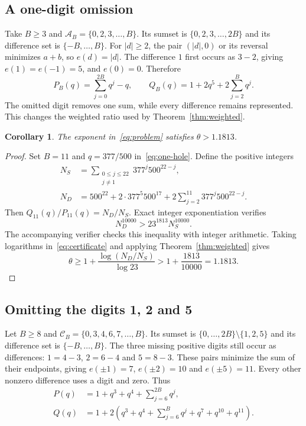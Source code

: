 \documentclass[11pt,a4paper]{article}
\newtheorem{corollary}[theorem]{Corollary}
\newcommand{\A}{\mathcal A}
\begin{document}
\subsection{A one-digit omission}

Take $B\ge3$ and $\A_B=\{0,2,3,\ldots,B\}$. Its sumset is
$\{0,2,3,\ldots,2B\}$ and its difference set is $\{-B,\ldots,B\}$.
For $|d|\ge2$, the pair $(|d|,0)$ or its reversal minimizes $a+b$, so
$e(d)=|d|$. The difference $1$ first occurs as $3-2$, giving
$e(1)=e(-1)=5$, and $e(0)=0$. Therefore
\begin{equation}\label{eq:one-hole}
 P_B(q)=\sum_{j=0}^{2B}q^j-q,
 \qquad
 Q_B(q)=1+2q^5+2\sum_{j=2}^{B}q^j.
\end{equation}
The omitted digit removes one sum, while every difference remains
represented. This changes the weighted ratio used by
Theorem~\ref{thm:weighted}.

\begin{corollary}\label{cor:explicit}
The exponent in~\eqref{eq:problem} satisfies $\theta>1.1813$.
\end{corollary}
\begin{proof}
Set $B=11$ and $q=377/500$ in~\eqref{eq:one-hole}. Define the positive
integers
\begin{align}
 N_S&=\sum_{\substack{0\le j\le22\\j\ne1}}
              377^j500^{22-j},\label{eq:NS}\\
 N_D&=500^{22}+2\cdot377^5 500^{17}
                   +2\sum_{j=2}^{11}377^j500^{22-j}.\label{eq:ND}
\end{align}
Then $Q_{11}(q)/P_{11}(q)=N_D/N_S$. Exact integer exponentiation verifies
\begin{equation}\label{eq:certificate}
 N_D^{10000}>23^{1813}N_S^{10000}.
\end{equation}
The accompanying verifier checks this inequality with integer arithmetic.
Taking logarithms
in~\eqref{eq:certificate} and applying Theorem~\ref{thm:weighted} gives
\[
 \theta\ge1+\frac{\log(N_D/N_S)}{\log23}
 >1+\frac{1813}{10000}=1.1813.
\]
\end{proof}

\subsection{Omitting the digits 1, 2 and 5}
Let $B\ge8$ and $\mathcal C_B=\{0,3,4,6,7,\ldots,B\}$.
Its sumset is $\{0,\ldots,2B\}\setminus\{1,2,5\}$ and its difference
set is $\{-B,\ldots,B\}$. The three missing positive digits still occur
as differences: $1=4-3$, $2=6-4$ and $5=8-3$. These pairs minimize the sum
of their endpoints, giving $e(\pm1)=7$, $e(\pm2)=10$ and $e(\pm5)=11$.
Every other nonzero difference uses a digit and zero. Thus
\begin{align}
 P(q)&=1+q^3+q^4+\sum_{j=6}^{2B}q^j,\label{eq:three-hole-sums}\\
 Q(q)&=1+2\left(q^3+q^4+\sum_{j=6}^{B}q^j+q^7+q^{10}+q^{11}\right).
 \label{eq:three-hole-differences}
\end{align}
\end{document}
